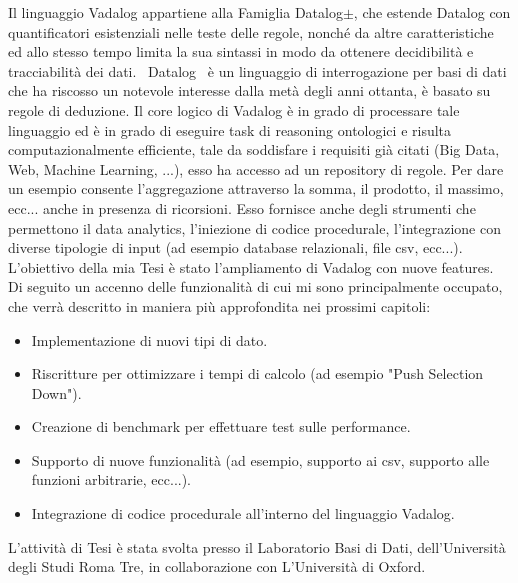 Il linguaggio Vadalog appartiene alla Famiglia Datalog$\pm $, che estende Datalog con quantificatori esistenziali nelle teste delle regole, nonché da altre caratteristiche ed allo stesso tempo limita la sua sintassi in modo da ottenere decidibilità e tracciabilità dei dati.~\cite{cali2013taming,cali2012towards,cali2010datalog+}\newline
Datalog~\cite{atzeni2006basi} è un linguaggio di interrogazione per basi di dati che ha riscosso un notevole interesse dalla metà degli anni ottanta, è basato su regole di deduzione. \newline
Il core logico di Vadalog è in grado di processare tale linguaggio ed è in grado di eseguire task di reasoning ontologici e risulta computazionalmente efficiente, tale da soddisfare i requisiti già citati (Big Data, Web, Machine Learning, ...), esso ha accesso ad un repository di regole. Per dare un esempio consente l'aggregazione attraverso la somma, il prodotto, il massimo, ecc... anche in presenza di ricorsioni. \newline
Esso fornisce anche degli strumenti che permettono il data analytics, l'iniezione di codice procedurale, l'integrazione con diverse tipologie di input (ad esempio database relazionali, file csv, ecc...).\newline \newline
L'obiettivo della mia Tesi è stato l'ampliamento di Vadalog con nuove features. \newline
Di seguito un accenno delle funzionalità di cui mi sono principalmente occupato, che verrà descritto in maniera più approfondita nei prossimi capitoli:
\begin{itemize}
	\item Implementazione di nuovi tipi di dato.
	\item Riscritture per ottimizzare i tempi di calcolo (ad esempio "Push Selection Down").
	\item Creazione di benchmark per effettuare test sulle performance.
	\item Supporto di nuove funzionalità (ad esempio, supporto ai csv, supporto alle funzioni arbitrarie, ecc...).
	\item Integrazione di codice procedurale all'interno del linguaggio Vadalog.
\end{itemize}
L'attività di Tesi è stata svolta presso il Laboratorio Basi di Dati, dell'Università degli Studi Roma Tre, in collaborazione con L'Università di Oxford.
